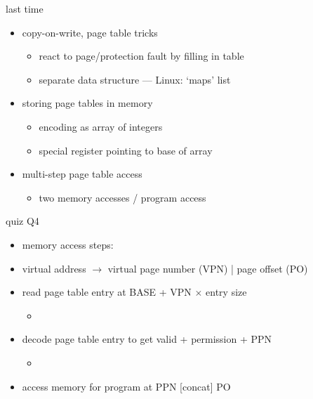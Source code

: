 \date{}
\title{}
\date{}

\begin{frame}
    \titlepage
\end{frame}



\begin{frame}{last time}
    \begin{itemize}
    \item copy-on-write, page table tricks
        \begin{itemize}
        \item react to page/protection fault by filling in table
        \item separate data structure --- Linux: `maps' list
        \end{itemize}
    \item storing page tables in memory
        \begin{itemize}
        \item encoding as array of integers
        \item special register pointing to base of array
        \end{itemize}
    \item multi-step page table access
        \begin{itemize}
        \item two memory accesses / program access
        \end{itemize}
    \end{itemize}
\end{frame}

\begin{frame}{quiz Q4}
    \begin{itemize}
    \item memory access steps:
    \vspace{.5cm}
    \item virtual address $\rightarrow$ virtual page number (VPN) | page offset (PO)
    \item read page table entry at BASE + VPN $\times$ entry size
        \begin{itemize}
        \item<2-> 
        \end{itemize}
    \item decode page table entry to get valid  + permission + PPN
        \begin{itemize}
        \item<2-> 
        \end{itemize}
    \item access memory for program at PPN [concat] PO
    \end{itemize}
\end{frame}

